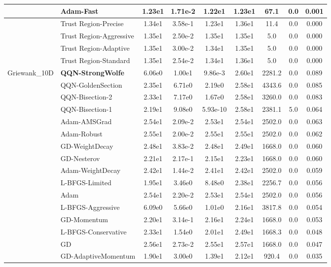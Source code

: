 \documentclass{article}
\begin{document}
\begin{longtable}{|l|l|c|c|c|c|c|c|c|}
\hline
 & Adam-Fast & 1.23e1 & 1.71e-2 & 1.22e1 & 1.23e1 & 67.1 & 0.0 & 0.001 \\
\hline
 & Trust Region-Precise & 1.34e1 & 3.58e-1 & 1.23e1 & 1.36e1 & 11.4 & 0.0 & 0.000 \\
\hline
 & Trust Region-Aggressive & 1.35e1 & 2.50e-2 & 1.35e1 & 1.35e1 & 5.0 & 0.0 & 0.000 \\
\hline
 & Trust Region-Adaptive & 1.35e1 & 3.00e-2 & 1.34e1 & 1.35e1 & 5.0 & 0.0 & 0.000 \\
\hline
 & Trust Region-Standard & 1.35e1 & 2.54e-2 & 1.34e1 & 1.36e1 & 5.0 & 0.0 & 0.000 \\
Griewank\_10D & \textbf{QQN-StrongWolfe} & 6.06e0 & 1.00e1 & 9.86e-3 & 2.60e1 & 2281.2 & 0.0 & 0.089 \\
\hline
 & QQN-GoldenSection & 2.35e1 & 6.71e0 & 2.19e0 & 2.58e1 & 4343.6 & 0.0 & 0.085 \\
\hline
 & QQN-Bisection-2 & 2.33e1 & 7.17e0 & 1.67e0 & 2.58e1 & 3260.0 & 0.0 & 0.083 \\
\hline
 & QQN-Bisection-1 & 2.19e1 & 9.08e0 & 5.93e-10 & 2.58e1 & 2381.1 & 5.0 & 0.064 \\
\hline
 & Adam-AMSGrad & 2.54e1 & 2.09e-2 & 2.53e1 & 2.54e1 & 2502.0 & 0.0 & 0.063 \\
\hline
 & Adam-Robust & 2.55e1 & 2.00e-2 & 2.55e1 & 2.55e1 & 2502.0 & 0.0 & 0.062 \\
\hline
 & GD-WeightDecay & 2.48e1 & 3.83e-2 & 2.48e1 & 2.49e1 & 1668.0 & 0.0 & 0.060 \\
\hline
 & GD-Nesterov & 2.21e1 & 2.17e-1 & 2.15e1 & 2.23e1 & 1668.0 & 0.0 & 0.060 \\
\hline
 & Adam-WeightDecay & 2.42e1 & 1.44e-2 & 2.41e1 & 2.42e1 & 2502.0 & 0.0 & 0.059 \\
\hline
 & L-BFGS-Limited & 1.95e1 & 3.46e0 & 8.48e0 & 2.38e1 & 2256.7 & 0.0 & 0.056 \\
\hline
 & Adam & 2.54e1 & 2.20e-2 & 2.53e1 & 2.54e1 & 2502.0 & 0.0 & 0.056 \\
\hline
 & L-BFGS-Aggressive & 6.09e0 & 5.66e0 & 1.01e0 & 2.16e1 & 3817.8 & 0.0 & 0.054 \\
\hline
 & GD-Momentum & 2.20e1 & 3.14e-1 & 2.16e1 & 2.24e1 & 1668.0 & 0.0 & 0.053 \\
\hline
 & L-BFGS-Conservative & 2.33e1 & 1.54e0 & 2.01e1 & 2.49e1 & 1668.3 & 0.0 & 0.048 \\
\hline
 & GD & 2.56e1 & 2.73e-2 & 2.55e1 & 2.57e1 & 1668.0 & 0.0 & 0.047 \\
\hline
 & GD-AdaptiveMomentum & 1.90e1 & 3.00e0 & 1.39e1 & 2.12e1 & 920.4 & 0.0 & 0.035 \\

\end{longtable}
\end{document}
